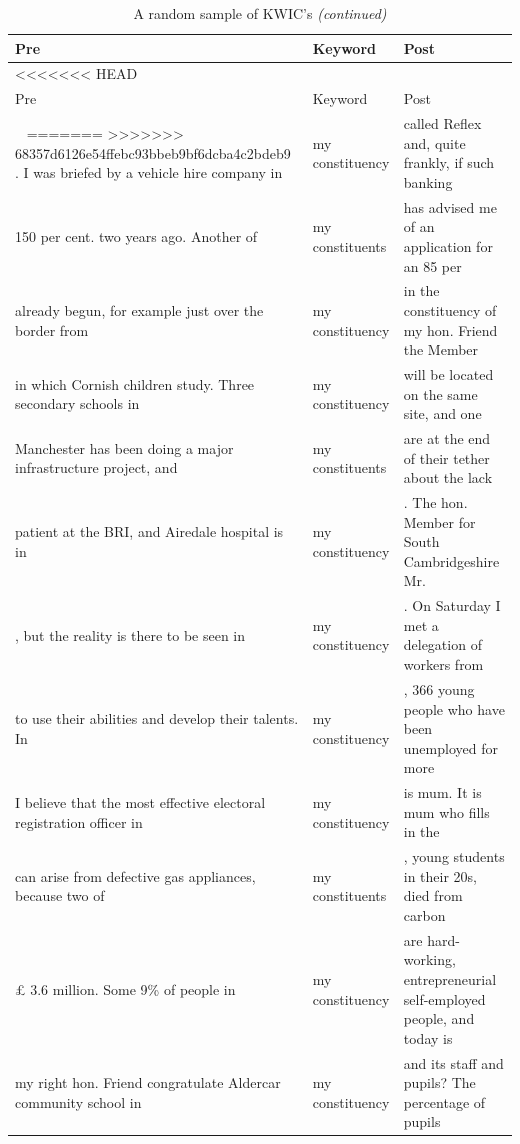 \documentclass[]{article}
\theoremstyle{definition}
\theoremstyle{definition}
\theoremstyle{definition}
\theoremstyle{remark}
\begin{document}
\begin{table}[H]
\begin{table}[H]
\begin{table}[H]
\begin{table}[H]
\begin{table}[H]
\begin{table}[H]
\begin{table}[H]
\begin{table}[H]
\begin{longtabu} to 
\caption{\label{tab:constituent-kwic}A random sample of KWIC's}\\
\toprule
Pre & Keyword & Post\\
\midrule
<<<<<<< HEAD
\endfirsthead
\caption[]{\label{tab:constituent-kwic}A random sample of KWIC's \textit{(continued)}}\\
\toprule
Pre & Keyword & Post\\
\midrule
\endhead
\
\endfoot
\bottomrule
\endlastfoot
=======
>>>>>>> 68357d6126e54ffebc93bbeb9bf6dcba4c2bdeb9
. I was briefed by a vehicle hire company in & my constituency & called Reflex and, quite frankly, if such banking\\
150 per cent. two years ago. Another of & my constituents & has advised me of an application for an 85 per\\
already begun, for example just over the border from & my constituency & in the constituency of my hon. Friend the Member\\
in which Cornish children study. Three secondary schools in & my constituency & will be located on the same site, and one\\
Manchester has been doing a major infrastructure project, and & my constituents & are at the end of their tether about the lack\\
\addlinespace
patient at the BRI, and Airedale hospital is in & my constituency & . The hon. Member for South Cambridgeshire Mr.\\
, but the reality is there to be seen in & my constituency & . On Saturday I met a delegation of workers from\\
to use their abilities and develop their talents. In & my constituency & , 366 young people who have been unemployed for more\\
I believe that the most effective electoral registration officer in & my constituency & is mum. It is mum who fills in the\\
can arise from defective gas appliances, because two of & my constituents & , young students in their 20s, died from carbon\\
\addlinespace
£ 3.6 million. Some 9\% of people in & my constituency & are hard-working, entrepreneurial self-employed people, and today is\\
my right hon. Friend congratulate Aldercar community school in & my constituency & and its staff and pupils? The percentage of pupils\\

\end{longtabu}
\end{table}
\end{table}
\end{table}
\end{table}
\end{table}
\end{table}
\end{table}
\end{table}
\end{document}
